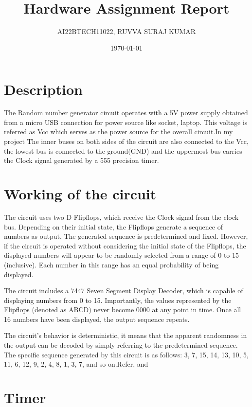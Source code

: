 \documentclass[journal,12pt,twocolumn]{IEEEtran}
\begin{document}
\title{Hardware Assignment Report}
\author{AI22BTECH11022, RUVVA SURAJ KUMAR}
\date{\today}

\maketitle

\section{Description}

The Random number generator circuit operates with a 5V power supply obtained from a micro USB connection for power source like socket, laptop. This voltage is referred as Vcc which serves as the power source for the overall circuit.In my project The inner buses on both sides of the circuit are also connected to the Vcc, the lowest bus is connected to the ground(GND) and the uppermost bus carries the Clock signal generated by a 555 precision timer.

\section{Working of the circuit}

The circuit uses two D Flipflops, which receive the Clock signal from the clock bus. Depending on their initial state, the Flipflops generate a sequence of numbers as output. The generated sequence is predetermined and fixed. However, if the circuit is operated without considering the initial state of the Flipflops, the displayed numbers will appear to be randomly selected from a range of 0 to 15 (inclusive). Each number in this range has an equal probability of being displayed.

The circuit includes a 7447 Seven Segment Display Decoder, which is capable of displaying numbers from 0 to 15. Importantly, the values represented by the Flipflops (denoted as ABCD) never become 0000 at any point in time. Once all 16 numbers have been displayed, the output sequence repeats.

The circuit's behavior is deterministic, it means that the apparent randomness in the output can be decoded by simply referring to the predetermined sequence. The specific sequence generated by this circuit is as follows: 3, 7, 15, 14, 13, 10, 5, 11, 6, 12, 9, 2, 4, 8, 1, 3, 7, and so on.Refer,  and 




\section{Timer}
\end{document}
